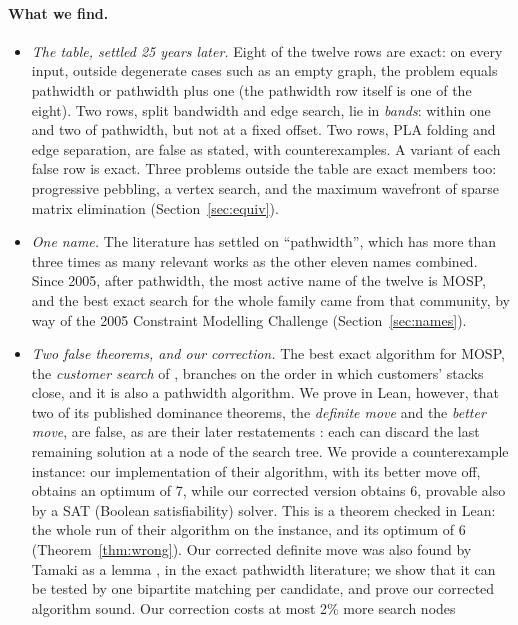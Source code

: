\paragraph{What we find.}
\begin{itemize}
\item \emph{The table, settled 25 years later.} Eight of the twelve rows are exact: on every
  input, outside degenerate cases such as an empty graph, the problem equals
  pathwidth or pathwidth plus one (the pathwidth row itself is one of the
  eight). Two rows, split bandwidth and edge
  search, lie in \emph{bands}: within one and two of pathwidth, but not at a
  fixed offset. Two rows, PLA folding and edge
  separation, are false as stated, with counterexamples. A variant of each
  false row is exact. Three problems outside the table are exact members
  too: progressive pebbling, a vertex search, and the maximum wavefront of
  sparse matrix elimination (Section~\ref{sec:equiv}).
\item \emph{One name.} The literature has settled on ``pathwidth'', which has
  more than three times as many relevant works as the other eleven names
  combined. Since 2005, after pathwidth, the most active name of the twelve is
  MOSP, and the best exact search for the whole family came from that
  community, by way of the 2005 Constraint Modelling Challenge
  (Section~\ref{sec:names}).
\item \emph{Two false theorems, and our correction.} The best exact algorithm
  for MOSP, the \emph{customer search} of \citet{ChuStuckey2009}, branches on the order in which customers' stacks
  close, and it is also a pathwidth algorithm. We prove in Lean, however, that
  two of its published dominance theorems, the \emph{definite move} and the
  \emph{better move}, are false, as are their later restatements
  \citep{Chu2011,Fink2012}: each can discard the last remaining solution at a
  node of the search tree. We provide a counterexample instance: our
  implementation of their algorithm, with its better move off, obtains an
  optimum of 7, while our corrected version obtains 6, provable also by a SAT
  (Boolean satisfiability) solver. This is a theorem checked in Lean: the
  whole run of their algorithm on the instance, and its optimum of 6
  (Theorem~\ref{thm:wrong}). Our corrected
  definite move was also found by Tamaki as a lemma
  \citep[Lemma~1]{Kitsunai2016}, in the exact pathwidth literature; we show
  that it can be tested by one bipartite matching per candidate, and prove our
  corrected algorithm sound. Our correction costs at most 2\% more search nodes

\end{itemize}

